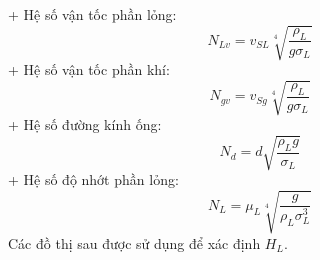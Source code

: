 \documentclass[12pt,a4paper]{report}
\begin{document}
\hspace*{1cm}+ Hệ số vận tốc phần lỏng:
	\begin{equation}
	N_{Lv} = v_{SL} \sqrt[4]{\dfrac{\rho_L}{g\sigma_L}}
	\end{equation}	
\hspace*{1cm}+ Hệ số vận tốc phần khí:
	\begin{equation}
	N_{gv} = v_{Sg} \sqrt[4]{\dfrac{\rho_L}{g\sigma_L}}
	\end{equation}	
\hspace*{1cm}+ Hệ số đường kính ống:
	\begin{equation}
	N_{d} = d \sqrt{\dfrac{\rho_Lg}{\sigma_L}}
	\end{equation}
\hspace*{1cm}+ Hệ số độ nhớt phần lỏng:
	\begin{equation}
	N_{L} = \mu_L \sqrt[4]{\dfrac{g}{\rho_L\sigma_L^3}}
	\end{equation}
Các đồ thị sau được sử dụng để xác định $H_L$.
\end{document}
